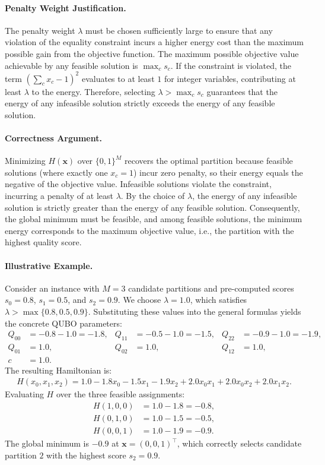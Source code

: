 \documentclass[12pt]{article}
\begin{document}
\paragraph{Penalty Weight Justification.}
The penalty weight $\lambda$ must be chosen sufficiently large to ensure that any violation of the equality constraint incurs a higher energy cost than the maximum possible gain from the objective function. The maximum possible objective value achievable by any feasible solution is $\max_{c} s_c$. If the constraint is violated, the term $\left( \sum_{c} x_c - 1 \right)^2$ evaluates to at least $1$ for integer variables, contributing at least $\lambda$ to the energy. Therefore, selecting $\lambda > \max_{c} s_c$ guarantees that the energy of any infeasible solution strictly exceeds the energy of any feasible solution.

\paragraph{Correctness Argument.}
Minimizing $H(\mathbf{x})$ over $\{0,1\}^M$ recovers the optimal partition because feasible solutions (where exactly one $x_c = 1$) incur zero penalty, so their energy equals the negative of the objective value. Infeasible solutions violate the constraint, incurring a penalty of at least $\lambda$. By the choice of $\lambda$, the energy of any infeasible solution is strictly greater than the energy of any feasible solution. Consequently, the global minimum must be feasible, and among feasible solutions, the minimum energy corresponds to the maximum objective value, i.e., the partition with the highest quality score.

\paragraph{Illustrative Example.}
Consider an instance with $M = 3$ candidate partitions and pre-computed scores $s_0 = 0.8$, $s_1 = 0.5$, and $s_2 = 0.9$. We choose $\lambda = 1.0$, which satisfies $\lambda > \max\{0.8, 0.5, 0.9\}$. Substituting these values into the general formulas yields the concrete QUBO parameters:
\begin{align}
Q_{00} &= -0.8 - 1.0 = -1.8, & Q_{11} &= -0.5 - 1.0 = -1.5, & Q_{22} &= -0.9 - 1.0 = -1.9, \\
Q_{01} &= 1.0, & Q_{02} &= 1.0, & Q_{12} &= 1.0, \\
c &= 1.0.
\end{align}
The resulting Hamiltonian is:
\begin{align}
H(x_0, x_1, x_2) = 1.0 - 1.8 x_0 - 1.5 x_1 - 1.9 x_2 + 2.0 x_0 x_1 + 2.0 x_0 x_2 + 2.0 x_1 x_2.
\end{align}
Evaluating $H$ over the three feasible assignments:
\begin{align}
H(1, 0, 0) &= 1.0 - 1.8 = -0.8, \\
H(0, 1, 0) &= 1.0 - 1.5 = -0.5, \\
H(0, 0, 1) &= 1.0 - 1.9 = -0.9.
\end{align}
The global minimum is $-0.9$ at $\mathbf{x} = (0, 0, 1)^\top$, which correctly selects candidate partition $2$ with the highest score $s_2 = 0.9$.
\end{document}
